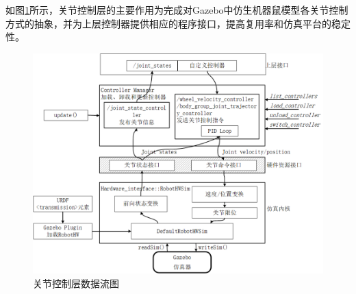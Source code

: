 



如图\ref{figure_bottomlayer}所示，关节控制层的主要作用为完成对Gazebo中仿生机器鼠模型各关节控制方式的抽象，并为上层控制器提供相应的程序接口，提高复用率和仿真平台的稳定性。
\begin{figure}[htb]
  \centering
  \includegraphics[width=0.55\linewidth]{images/ch03/bottomlayer.png}
  \caption{关节控制层数据流图}\label{figure_bottomlayer}
\end{figure}

